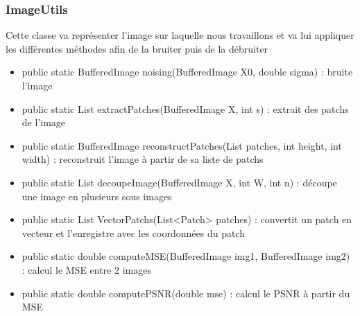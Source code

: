 \subsubsection{ImageUtils}
Cette classe va représenter l'image sur laquelle nous travaillons et va lui appliquer les différentes méthodes afin de la bruiter puis de la débruiter
\begin{itemize}
    \item public static BufferedImage noising(BufferedImage X0, double sigma) : bruite l'image
    \item public static List extractPatches(BufferedImage X, int s) : extrait des patchs de l'image
    \item public static BufferedImage reconstructPatches(List patches, int height, int width) : reconstruit l'image à partir de sa liste de patchs
    \item public static List decoupeImage(BufferedImage X, int W, int n) : découpe une image en plusieurs sous images
    \item public static List VectorPatchs(List<Patch> patches) : convertit un patch en vecteur et l'enregistre avec les coordonnées du patch
    \item public static double computeMSE(BufferedImage img1, BufferedImage img2) : calcul le MSE entre 2 images
    \item public static double computePSNR(double mse) : calcul le PSNR à partir du MSE
\end{itemize}

